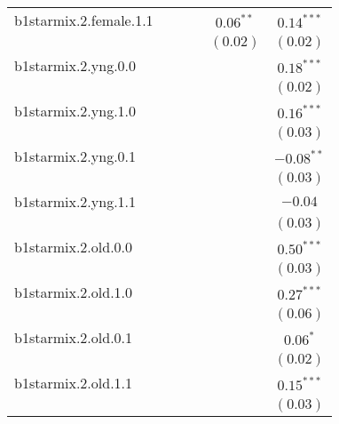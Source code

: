 \begin{table}
\begin{center}
\begin{tabular}{l c c c c c}
b1starmix.2.female.1.1 &               &               &               & $0.06^{**}$   & $0.14^{***}$  \\
                       &               &               &               & $(0.02)$      & $(0.02)$      \\
b1starmix.2.yng.0.0    &               &               &               &               & $0.18^{***}$  \\
                       &               &               &               &               & $(0.02)$      \\
b1starmix.2.yng.1.0    &               &               &               &               & $0.16^{***}$  \\
                       &               &               &               &               & $(0.03)$      \\
b1starmix.2.yng.0.1    &               &               &               &               & $-0.08^{**}$  \\
                       &               &               &               &               & $(0.03)$      \\
b1starmix.2.yng.1.1    &               &               &               &               & $-0.04$       \\
                       &               &               &               &               & $(0.03)$      \\
b1starmix.2.old.0.0    &               &               &               &               & $0.50^{***}$  \\
                       &               &               &               &               & $(0.03)$      \\
b1starmix.2.old.1.0    &               &               &               &               & $0.27^{***}$  \\
                       &               &               &               &               & $(0.06)$      \\
b1starmix.2.old.0.1    &               &               &               &               & $0.06^{*}$    \\
                       &               &               &               &               & $(0.02)$      \\
b1starmix.2.old.1.1    &               &               &               &               & $0.15^{***}$  \\
                       &               &               &               &               & $(0.03)$      \\

\end{tabular}
\end{center}
\end{table}
